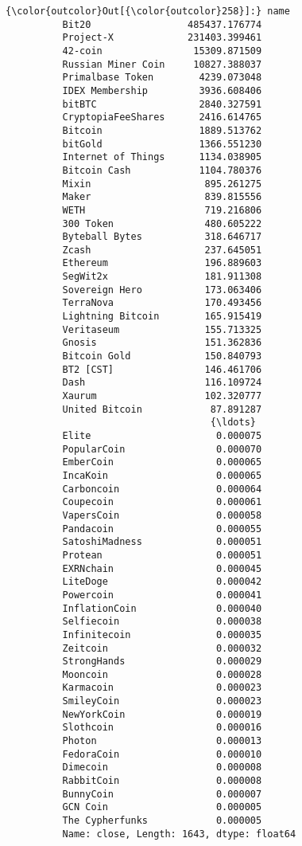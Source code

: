 \documentclass[11pt]{article}
\begin{document}
\begin{Verbatim}[commandchars=\\\{\}]
{\color{outcolor}Out[{\color{outcolor}258}]:} name
          Bit20                 485437.176774
          Project-X             231403.399461
          42-coin                15309.871509
          Russian Miner Coin     10827.388037
          Primalbase Token        4239.073048
          IDEX Membership         3936.608406
          bitBTC                  2840.327591
          CryptopiaFeeShares      2416.614765
          Bitcoin                 1889.513762
          bitGold                 1366.551230
          Internet of Things      1134.038905
          Bitcoin Cash            1104.780376
          Mixin                    895.261275
          Maker                    839.815556
          WETH                     719.216806
          300 Token                480.605222
          Byteball Bytes           318.646717
          Zcash                    237.645051
          Ethereum                 196.889603
          SegWit2x                 181.911308
          Sovereign Hero           173.063406
          TerraNova                170.493456
          Lightning Bitcoin        165.915419
          Veritaseum               155.713325
          Gnosis                   151.362836
          Bitcoin Gold             150.840793
          BT2 [CST]                146.461706
          Dash                     116.109724
          Xaurum                   102.320777
          United Bitcoin            87.891287
                                    {\ldots}      
          Elite                      0.000075
          PopularCoin                0.000070
          EmberCoin                  0.000065
          IncaKoin                   0.000065
          Carboncoin                 0.000064
          Coupecoin                  0.000061
          VapersCoin                 0.000058
          Pandacoin                  0.000055
          SatoshiMadness             0.000051
          Protean                    0.000051
          EXRNchain                  0.000045
          LiteDoge                   0.000042
          Powercoin                  0.000041
          InflationCoin              0.000040
          Selfiecoin                 0.000038
          Infinitecoin               0.000035
          Zeitcoin                   0.000032
          StrongHands                0.000029
          Mooncoin                   0.000028
          Karmacoin                  0.000023
          SmileyCoin                 0.000023
          NewYorkCoin                0.000019
          Slothcoin                  0.000016
          Photon                     0.000013
          FedoraCoin                 0.000010
          Dimecoin                   0.000008
          RabbitCoin                 0.000008
          BunnyCoin                  0.000007
          GCN Coin                   0.000005
          The Cypherfunks            0.000005
          Name: close, Length: 1643, dtype: float64
\end{Verbatim}
            
\end{document}
